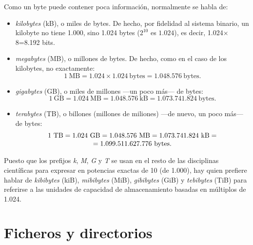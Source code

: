 Como un byte puede contener poca información, normalmente se habla de: \begin{itemize} \item \emph{kilobytes} (kB), o miles de bytes. De hecho, por fidelidad al sistema binario, un kilobyte no tiene 1.000, sino 1.024 bytes ($2^{10}$ es $1.024$), es decir, 1.024$\times$8=8.192 bits. \item \emph{megabytes} (MB), o millones de bytes. De hecho, como en el caso de los kilobytes, no exactamente: $$1~\mbox{MB} = 1.024 \times 1.024~\mbox{bytes}= 1.048.576~\mbox{bytes}.$$ \item \emph{gigabytes} (GB), o miles de millones ---un poco más--- de bytes: $$1~\mbox{GB}=1.024~\mbox{MB}=1.048.576~\mbox{kB}=1.073.741.824~\mbox{bytes}.$$ \item \emph{terabytes} (TB), o billones (millones de miliones) ---de nuevo, un poco más--- de bytes: \[ \begin{array}{c} $$1~\mbox{TB}=1.024~\mbox{GB}=1.048.576~\mbox{MB}=1.073.741.824~\mbox{kB}=\\ =1.099.511.627.776~\mbox{bytes}.$$ \end{array} \] \end{itemize} Puesto que los prefijos \emph{k}, \emph{M}, \emph{G} y \emph{T} se usan en el resto de las disciplinas científicas para expresar en potencias exactas de 10 (de 1.000), hay quien prefiere hablar de \emph{kibibytes} (kiB), \emph{mibibytes} (MiB), \emph{gibibytes} (GiB) y \emph{tebibytes} (TiB) para referirse a las unidades de capacidad de almacenamiento basadas en múltiplos de 1.024. 

\section{Ficheros y directorios} \label{se:fitxers} \label{pg:fitxer} 

